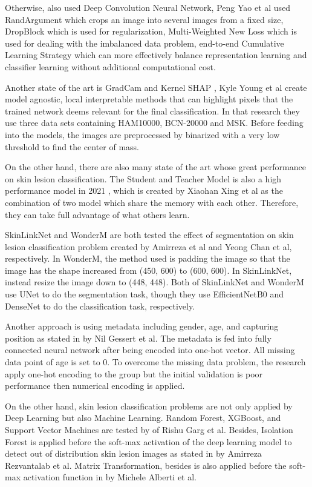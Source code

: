 \documentclass[sensors,article,submit,pdftex,moreauthors]{Definitions/mdpi}
\begin{document}
{Otherwise, \mbox{\cite{01284}} also used Deep Convolution Neural Network, Peng Yao et al used RandArgument which crops an image into several images from a fixed size, DropBlock which is used for regularization, Multi-Weighted New Loss which is used for dealing with the imbalanced data problem, end-to-end Cumulative Learning Strategy which can more effectively balance representation learning and classifier learning without additional computational cost. 
	
Another state of the art is GradCam and Kernel SHAP \mbox{\cite{06612}}, Kyle Young et al create model agnostic, local interpretable methods that can highlight pixels that the trained network deems relevant for the final classification. In that research they use three data sets containing HAM10000, BCN-20000 and MSK. Before feeding into the models, the images are preprocessed by binarized with a very low threshold to find the center of mass. 
	
On the other hand, there are also many state of the art whose great performance on skin lesion classification. The Student and Teacher Model is also a high performance model in 2021 \mbox{\cite{03225}}, which is created by Xiaohan Xing et al as the combination of two model which share the memory with each other. Therefore, they can take full advantage of what others learn. 

SkinLinkNet \mbox{\cite{12602}} and WonderM \mbox{\cite{03426}} are both tested the effect of segmentation on skin lesion classification problem created by Amirreza et al and Yeong Chan et al, respectively. In WonderM, the method used is padding the image so that the image has the shape increased from (450, 600) to (600, 600). In SkinLinkNet, instead resize the image down to (448, 448). Both of SkinLinkNet and WonderM use UNet to do the segmentation task, though they use EfficientNetB0 and DenseNet to do the classification task, respectively. 
	
Another approach is using metadata including gender, age, and capturing position as stated in \mbox{\cite{03910}} by Nil Gessert et al. The metadata is fed into fully connected neural network after being encoded into one-hot vector. All missing data point of age is set to 0. To overcome the missing data problem, the research apply one-hot encoding to the group but the initial validation is poor performance then numerical encoding is applied.
	
On the other hand, skin lesion classification problems are not only applied by Deep Learning but also Machine Learning. Random Forest, XGBoost, and Support Vector Machines are tested by \mbox{\cite{03798}} of Rishu Garg et al. Besides, Isolation Forest is applied before the soft-max activation of the deep learning model to detect out of distribution skin lesion images as stated in \mbox{\cite{10348}} by Amirreza Rezvantalab et al. Matrix Transformation, besides is also applied before the soft-max activation function in \mbox{\cite{05045}} by Michele Alberti et al.}
\end{document}
